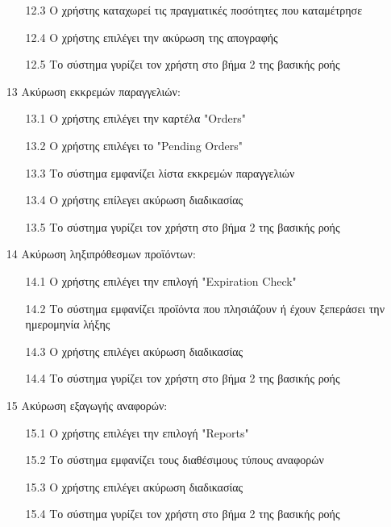 \documentclass[12pt,a4paper,twoside]{book}
\begin{document}
\begin{enumerate}
\begin{enumerate}
          \item [12.3 ] Ο χρήστης καταχωρεί τις πραγματικές ποσότητες που καταμέτρησε
          \item [12.4 ] Ο χρήστης επιλέγει την ακύρωση της απογραφής
          \item [12.5 ] Το σύστημα γυρίζει τον χρήστη στο βήμα 2 της βασικής ροής
        \end{enumerate}
  \item[13 ] Ακύρωση εκκρεμών παραγγελιών:
        \begin{enumerate}
          \item [13.1 ] Ο χρήστης επιλέγει την καρτέλα "Orders"
          \item [13.2 ] Ο χρήστης επιλέγει το "Pending Orders"
          \item [13.3 ] Το σύστημα εμφανίζει λίστα εκκρεμών παραγγελιών
          \item [13.4 ] Ο χρήστης επίλεγει ακύρωση διαδικασίας
          \item [13.5 ] Το σύστημα γυρίζει τον χρήστη στο βήμα 2 της βασικής ροής
        \end{enumerate}
  \item[14 ] Ακύρωση ληξιπρόθεσμων προϊόντων:
        \begin{enumerate}
          \item [14.1 ] Ο χρήστης επιλέγει την επιλογή "Expiration Check"
          \item [14.2 ] Το σύστημα εμφανίζει προϊόντα που πλησιάζουν ή έχουν ξεπεράσει την ημερομηνία λήξης
          \item [14.3 ] Ο χρήστης επιλέγει ακύρωση διαδικασίας
          \item [14.4 ] Το σύστημα γυρίζει τον χρήστη στο βήμα 2 της βασικής ροής
        \end{enumerate}
  \item[15 ] Ακύρωση εξαγωγής αναφορών:
        \begin{enumerate}
          \item [15.1 ] Ο χρήστης επιλέγει την επιλογή "Reports"
          \item [15.2 ] Το σύστημα εμφανίζει τους διαθέσιμους τύπους αναφορών %
          \item [15.3 ] Ο χρήστης επιλέγει ακύρωση διαδικασίας
          \item [15.4 ] Το σύστημα γυρίζει τον χρήστη στο βήμα 2 της βασικής ροής
        \end{enumerate}

\end{enumerate}
\end{document}
